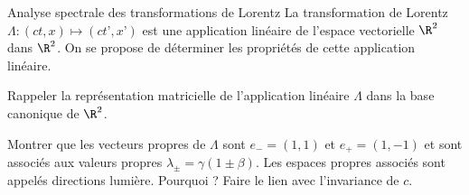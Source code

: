 


\begin{exo}[PC][2][TD]{Analyse spectrale des transformations de Lorentz}
La transformation de Lorentz $\Lambda : (ct,x) \mapsto (ct’,x’)$ est une application linéaire de l’espace vectorielle $\R^2$ dans $\R^2$. On se propose de déterminer les propriétés de cette application linéaire.
\begin{quest}
  \item	Rappeler la représentation matricielle de l’application linéaire $\Lambda$ dans la base canonique de $\R^2$.
  \item Montrer que les vecteurs propres de $\Lambda$ sont $e_- = (1,1)$ et $e_+ = (1,-1)$ et sont associés aux valeurs propres $\lambda_\pm = \gamma(1\pm\beta)$. Les espaces propres associés sont appelés directions lumière. Pourquoi ? Faire le lien avec  l’invariance de $c$.
\end{quest}
\end{exo}
